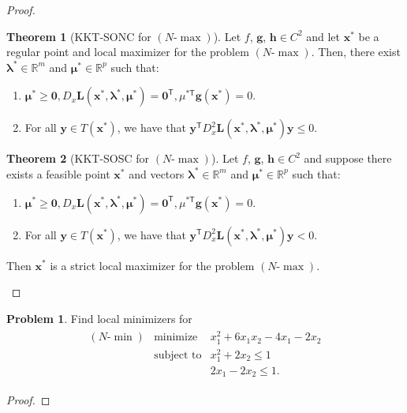 \documentclass[12pt]{article}
\theoremstyle{definition}
\newtheorem{problem}{Problem}
\newcommand{\vc}[1]{\boldsymbol{#1}}
\newcommand{\tran}{\mathsf{T}}
\newtheorem{theorem}{Theorem}
\begin{document}
\begin{proof}
  \begin{theorem}[KKT-SONC for $(N\text{-}\max)$]
    Let $f$, $\vc{g}$, $\vc{h} \in C^2$ and let
    $\vc{x}^*$ be a regular point and local maximizer for the problem $(N\text{-}\max)$. Then,
    there exist $\vc{\lambda}^*\in\mathbb{R}^m$
    and $\vc{\mu}^* \in \mathbb{R}^p$ such that:
    \begin{enumerate}[label=\roman*.]
      \item $\vc{\mu}^* \geq \vc{0}, D_x\vc{L}(\vc{x}^*, \vc{\lambda}^*, \vc{\mu}^*) = \vc{0}^\tran, \mu^{*\tran}\vc{g}(\vc{x}^*) = 0$.
      \item For all $\vc{y}\in T(\vc{x}^*)$, we have that $\vc{y}^\tran D_x^2\vc{L}(\vc{x}^*, \vc{\lambda}^*, \vc{\mu}^*)\vc{y} \leq 0$.
    \end{enumerate}
  \end{theorem}

  \begin{theorem}[KKT-SOSC for $(N\text{-}\max)$]
    Let $f$, $\vc{g}$, $\vc{h} \in C^2$ and suppose there exists a feasible point
    $\vc{x}^*$ and vectors $\vc{\lambda}^*\in\mathbb{R}^m$
    and $\vc{\mu}^* \in \mathbb{R}^p$ such that:
    \begin{enumerate}[label=\roman*.]
      \item $\vc{\mu}^* \geq \vc{0}, D_x\vc{L}(\vc{x}^*, \vc{\lambda}^*, \vc{\mu}^*) = \vc{0}^\tran, \mu^{*\tran}\vc{g}(\vc{x}^*) = 0$.
      \item For all $\vc{y}\in T(\vc{x}^*)$, we have that $\vc{y}^\tran D_x^2\vc{L}(\vc{x}^*, \vc{\lambda}^*, \vc{\mu}^*)\vc{y} < 0$.
    \end{enumerate}
    Then $\vc{x}^*$ is a strict local maximizer for the problem $(N\text{-}\max)$.
  \end{theorem}
\end{proof}
\newpage


\begin{problem}
  Find local minimizers for
  \begin{align*}
    \begin{array}{rrl}
      (N\text{-}\min) & \text{minimize} & x_1^2 + 6x_1x_2 -4x_1 -2x_2\\
      & \text{subject to} & x_1^2 + 2x_2 \leq 1\\
      & & 2x_1 -2x_2 \leq 1.
    \end{array}
  \end{align*}
\end{problem}

\begin{proof}
\end{proof}
\newpage
\end{document}
